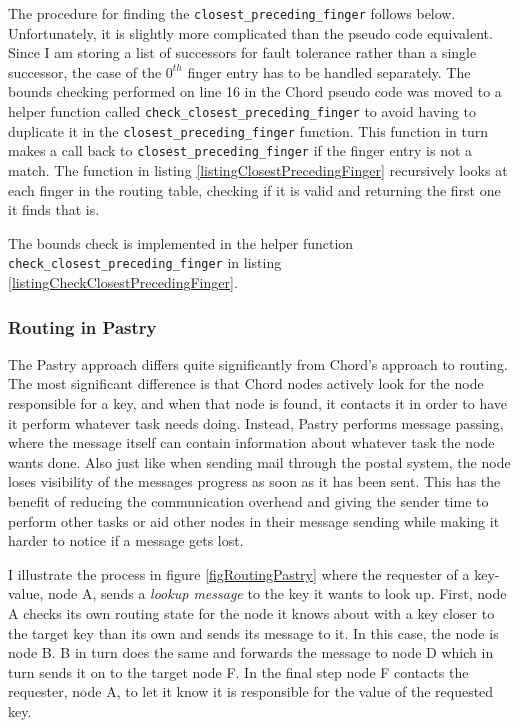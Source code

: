 The procedure for finding the \verb=closest_preceding_finger= follows below. Unfortunately, it is slightly more complicated than the pseudo code equivalent. Since I am storing a list of successors for fault tolerance rather than a single successor, the case of the $ 0^{th} $ finger entry has to be handled separately. 
The bounds checking performed on line 16 in the Chord pseudo code was moved to a helper function called \verb=check_closest_preceding_finger= to avoid having to duplicate it in the \verb=closest_preceding_finger= function.
This function in turn makes a call back to \verb=closest_preceding_finger= if the finger entry is not a match.
The function in listing \ref{listingClosestPrecedingFinger} recursively looks at each finger in the routing table, checking if it is valid and returning the first one it finds that is.



The bounds check is implemented in the helper function \verb=check_closest_preceding_finger= in listing \ref{listingCheckClosestPrecedingFinger}.



\subsubsection{Routing in Pastry}
\label{sec:routingInPastry}
The Pastry approach differs quite significantly from Chord's approach to routing.
The most significant difference is that Chord nodes actively look for the node responsible for a key, and when that node is found, it contacts it in order to have it perform whatever task needs doing. Instead, Pastry performs message passing, where the message itself can contain information about whatever task the node wants done.
Also just like when sending mail through the postal system, the node loses visibility of the messages progress as soon as it has been sent. This has the benefit of reducing the communication overhead and giving the sender time to perform other tasks or aid other nodes in their message sending while making it harder to notice if a message gets lost.

I illustrate the process in figure \ref{figRoutingPastry} where the requester of a key-value, node A, sends a \emph{lookup message} to the key it wants to look up. First, node A checks its own routing state for the node it knows about with a key closer to the target key than its own and sends its message to it. In this case, the node is node B. B in turn does the same and forwards the message to node D which in turn sends it on to the target node F. In the final step node F contacts the requester, node A, to let it know it is responsible for the value of the requested key. 

